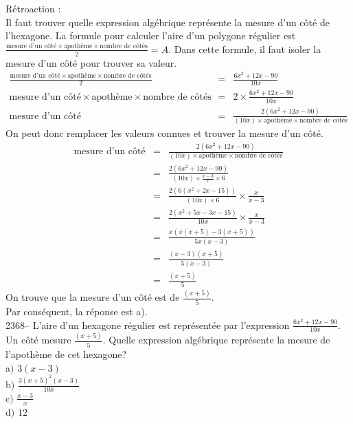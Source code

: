 \documentclass[letterpaper, 12pt]{article}
\begin{document}
R\'etroaction :\\
Il faut trouver quelle expression alg\'ebrique repr\'esente la mesure d'un c\^ot\'e de l'hexagone. La formule pour calculer l'aire d'un polygone r\'egulier est $\frac{\textrm{mesure d'un c\^ot\'e}\times\textrm{apoth\`eme}\times\textrm{nombre de c\^ot\'es}}{2}=A$. Dans cette formule, il faut isoler la mesure d'un c\^ot\'e pour trouver sa valeur.
\begin{eqnarray*}
\frac{\textrm{mesure d'un c\^ot\'e}\times\textrm{apoth\`eme}\times\textrm{nombre de c\^ot\'es}}{2}&=&\frac{6x^{2}+12x-90}{10x}\\[2mm]
\textrm{mesure d'un c\^ot\'e}\times\textrm{apoth\`eme}\times\textrm{nombre de c\^ot\'es}&=&2\times \frac{6x^{2}+12x-90}{10x}\\[2mm]
\textrm{mesure d'un c\^ot\'e}&=&\frac{2(6x^{2}+12x-90)}{(10x)\times\textrm{apoth\`eme}\times\textrm{nombre de c\^ot\'es}}
\end{eqnarray*}
On peut donc remplacer les valeurs connues et trouver la mesure d'un c\^ot\'e.
\begin{eqnarray*}
\textrm{mesure d'un c\^ot\'e}&=&\frac{2(6x^{2}+12x-90)}{(10x)\times\textrm{apoth\`eme}\times\textrm{nombre de c\^ot\'es}}\\[2mm]
&=&\frac{2(6x^{2}+12x-90)}{(10x)\times\frac{x-3}{x}\times6}\\[2mm]
&=&\frac{2(6(x^{2}+2x-15))}{(10x)\times6}\times\frac{x}{x-3}\\[2mm]
&=&\frac{2(x^{2}+5x-3x-15)}{10x}\times\frac{x}{x-3}\\[2mm]
&=&\frac{x(x(x+5)-3(x+5))}{5x(x-3)}\\[2mm]
&=&\frac{(x-3)(x+5)}{5(x-3)}\\[2mm]
&=&\frac{(x+5)}{5}
\end{eqnarray*}
On trouve que la mesure d'un c\^ot\'e est de $\frac{(x+5)}{5}$.\\
Par cons\'equent, la r\'eponse est a).\\

2368--  L'aire d'un hexagone r\'egulier est repr\'esent\'ee par l'expression $\frac{6x^{2}+12x-90}{10x}$. Un c\^ot\'e mesure $\frac{(x+5)}{5}$. Quelle expression alg\'ebrique repr\'esente la mesure de l'apoth\`eme de cet hexagone?\\

a$)$ $3(x-3)$\\[2mm]
b$)$ $\frac{3(x+5)^{2}(x-3)}{10x} $\\[2mm]
c$)$ $\frac{x-3}{x}$\\[2mm]
d$)$ $12 $\\
\end{document}
